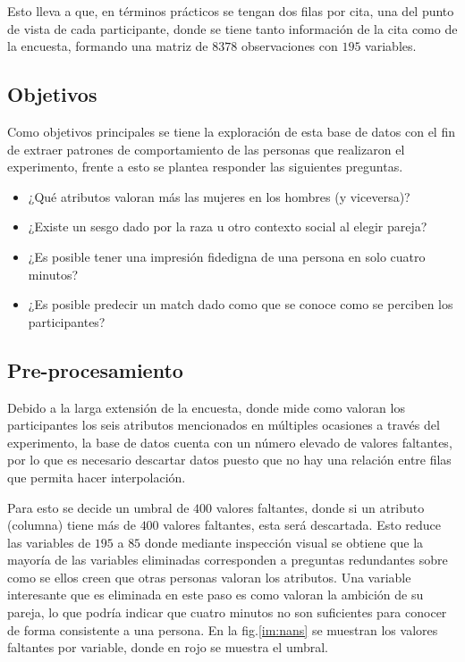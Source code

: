 Esto lleva a que, en términos prácticos se tengan dos filas por cita, una del punto de vista de cada participante, donde se tiene tanto información de la cita como de la encuesta, formando una matriz de $8378$ observaciones con $195$ variables.

\subsection{Objetivos}

Como objetivos principales se tiene la exploración de esta base de datos con el fin de extraer patrones de comportamiento de las personas que realizaron el experimento, frente a esto se plantea responder las siguientes preguntas.

\begin{itemize}
    \item ¿Qué atributos valoran más las mujeres en los hombres (y viceversa)?
    \item ¿Existe un sesgo dado por la raza u otro contexto social al elegir pareja?
    \item ¿Es posible tener una impresión fidedigna de una persona en solo cuatro minutos?
    \item ¿Es posible predecir un match dado como que se conoce como se perciben los participantes?
\end{itemize}


\subsection{Pre-procesamiento}

Debido a la larga extensión de la encuesta, donde mide como valoran los participantes los seis atributos mencionados en múltiples ocasiones a través del experimento, la base de datos cuenta con un número elevado de valores faltantes, por lo que es necesario descartar datos puesto que no hay una relación entre filas que permita hacer interpolación.

Para esto se decide un umbral de $400$ valores faltantes, donde si un atributo (columna) tiene más de $400$ valores faltantes, esta será descartada. Esto reduce las variables de $195$ a $85$ donde mediante inspección visual se obtiene que la mayoría de las variables eliminadas corresponden a preguntas redundantes sobre como se ellos creen que otras personas valoran los atributos. Una variable interesante que es eliminada en este paso es como valoran la ambición de su pareja, lo que podría indicar que cuatro minutos no son suficientes para conocer de forma consistente a una persona. En la fig.\ref{im:nans} se muestran los valores faltantes por variable, donde en rojo se muestra el umbral.

